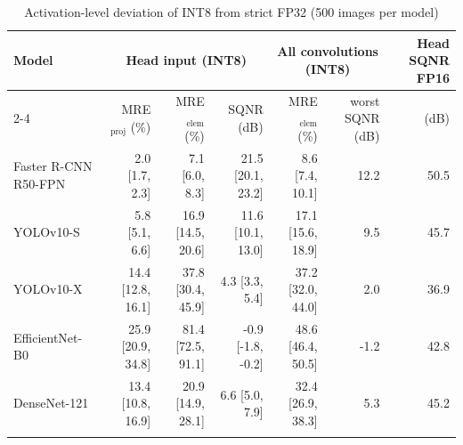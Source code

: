 \begin{table}
\footnotesize\setlength{\tabcolsep}{4pt}
\caption{Activation-level deviation of INT8 from strict FP32 (500 images per model)}\label{tab:layerstats}
\begin{tabular}{@{}lrrrrrr@{}}
\toprule
Model & \multicolumn{3}{c}{Head input (INT8)} & \multicolumn{2}{c}{All convolutions (INT8)} & Head SQNR FP16 \\
\cmidrule{2-4}\cmidrule{5-6}
 & MRE$_\text{proj}$ (\%) & MRE$_\text{elem}$ (\%) & SQNR (dB) & MRE$_\text{elem}$ (\%) & worst SQNR (dB) & (dB) \\
\midrule
Faster R-CNN R50-FPN & 2.0 [1.7, 2.3] & 7.1 [6.0, 8.3] & 21.5 [20.1, 23.2] & 8.6 [7.4, 10.1] & 12.2 & 50.5 \\
YOLOv10-S & 5.8 [5.1, 6.6] & 16.9 [14.5, 20.6] & 11.6 [10.1, 13.0] & 17.1 [15.6, 18.9] & 9.5 & 45.7 \\
YOLOv10-X & 14.4 [12.8, 16.1] & 37.8 [30.4, 45.9] & 4.3 [3.3, 5.4] & 37.2 [32.0, 44.0] & 2.0 & 36.9 \\
EfficientNet-B0 & 25.9 [20.9, 34.8] & 81.4 [72.5, 91.1] & -0.9 [-1.8, -0.2] & 48.6 [46.4, 50.5] & -1.2 & 42.8 \\
DenseNet-121 & 13.4 [10.8, 16.9] & 20.9 [14.9, 28.1] & 6.6 [5.0, 7.9] & 32.4 [26.9, 38.3] & 5.3 & 45.2 \\
\botrule
\end{tabular}
\end{table}
